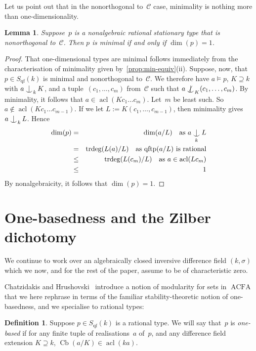 \documentclass[\DocOpts]{amsart}
\newtheorem{lemma}[theorem]{Lemma}
\theoremstyle{definition}
\newtheorem{definition}[theorem]{Definition}
\def\acfa{\operatorname{ACFA}}
\def\cb{\operatorname{Cb}}
\def\qftp{\operatorname{qftp}}
\def\qf{\operatorname{qf}}
\def\acl{\operatorname{acl}}
\def\trdeg{\operatorname{trdeg}}
\def\C{\mathcal{C}}
\newcommand{\<}{\langle}
\renewcommand{\>}{\rangle}
\def\Ind#1#2{#1\setbox0=\hbox{\(#1x\)}\kern\wd0\hbox to 
0pt{\hss\(#1\mid\)\hss}\lower.9\ht0\hbox to 
0pt{\hss\(#1\smile\)\hss}\kern\wd0}
\def\ind{\mathop{\mathpalette\Ind{}}}
\def\notind#1#2{#1\setbox0=\hbox{\(#1x\)}\kern\wd0\hbox to 
0pt{\mathchardef\nn=12854\hss\(#1\nn\)\kern1.4\wd0\hss}\hbox to 
0pt{\hss\(#1\mid\)\hss}\lower.9\ht0 \hbox to 
0pt{\hss\(#1\smile\)\hss}\kern\wd0}
\def\nind{\mathop{\mathpalette\notind{}}}
\begin{document}
Let us point out that in the nonorthogonal to~$\C$ case, minimality is nothing more than one-dimensionality.

\begin{lemma}
\label{lem:aim-dim1}
Suppose~\(p\) is a nonalgebraic rational stationary type that is nonorthogonal to~$\C$.
Then $p$ is minimal if and only if $\dim(p)=1$.
\end{lemma}

\begin{proof}
That one-dimensional types are minimal follows immediately from the characterisation of minimality given by~\ref{prop:min-equiv}(ii).
Suppose, now, that $p\in S_{\qf}(k)$ is minimal and nonorthogonal to~$\C$.
We therefore have $a\models p$, $K\supseteq k$ with $a\ind_kK$, and a tuple~$(c_1,\dots,c_m)$ from~$\C$ such that $a\nind_K(c_1,\dots,c_m)$.
By minimality, it follows that $a\in\acl(Kc_1\dots c_m)$.
Let~$m$ be least such.
So $a\notin\acl(Kc_1\dots c_{m-1})$.
If we let $L:=K(c_1,\dots, c_{m-1})$, then minimality gives $a\ind _kL$.
Hence
\begin{eqnarray*}
\dim(p)
&=&
\dim(a/L)\ \ \text{ as } a\ind _kL\\
&=&
\trdeg(L(a)/L)\ \ \text{ as $\qftp(a/L)$ is rational}\\
&\leq&
\trdeg(L(c_m)/L)\ \ \text{ as } a\in\acl(Lc_m)\\
&\leq&
1
\end{eqnarray*}
By nonalgebraicity, it follows that $\dim(p)=1$.
\end{proof}

\bigskip
\section{One-basedness and the Zilber dichotomy}
\label{sec:zd}

\noindent
We continue to work over an algebraically closed inversive difference field $(k,\sigma)$ which we now, and for the rest of the paper, assume to be of characteristic zero.

Chatzidakis and Hrushovski~\cite{acfa} introduce a notion of modularity for sets in $\acfa$ that we here rephrase in terms of the familiar stability-theoretic notion of one-basedness, and we  specialise to rational types:

\begin{definition}
Suppose $p\in S_{\qf}(k)$ is a rational type.
We will say that~$p$ is \emph{one-based} if for any finite tuple of 
realisations~$a$ of~$p$, and any difference field extension $K\supseteq k$, 
$\cb(a/K)\in \acl(ka)$.
\end{definition}
\end{document}
